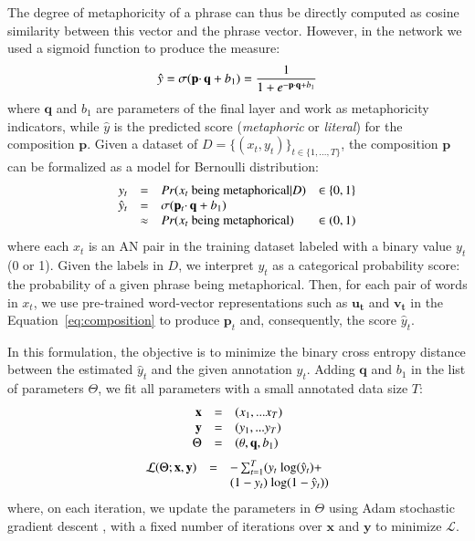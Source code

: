 The degree of metaphoricity of a phrase can thus be directly computed as cosine similarity between this vector and the phrase vector.
However, in the network we used a sigmoid function to produce the measure:  
\begin{equation}
\hat{y} = \sigma(\mathbf{p} \cdotp \mathbf{q} + b_1) \\
= \frac{1}{1+e^{-\mathbf{p} \cdotp \mathbf{q} + b_1}}
\end{equation}
where $\mathbf{q}$ and $b_1$ are parameters of the final layer and work as metaphoricity indicators, while $\hat{y}$ is the predicted score (\textit{metaphoric} or \textit{literal}) for the composition $\mathbf{p}$. Given a dataset of $D = \{(x_t, y_t)\}_{t \in \{1,...,T\}}$, the composition $\mathbf{p}$ can be formalized as a model for Bernoulli distribution:
\begin{equation}
    \begin{array}{r c l l}
        y_t &=& Pr(x_t\ \mathrm{being\ metaphorical}|D) &\in \{0,1\}\\
        \hat{y}_t & = & \sigma(\mathbf{p}_t \cdotp \mathbf{q} + b_1) & \\
        		  & \approx & Pr(x_t\ \mathrm{being\ metaphorical}) &\in (0, 1) \\
    \end{array}
\end{equation}
where each $x_t$ is an AN pair in the training dataset labeled with a binary value $y_t$  (0 or 1). Given the labels in $D$, we interpret $y_t$ as a categorical probability score: the probability of a given phrase being metaphorical. Then, for each pair of words in $x_t$, we use pre-trained word-vector representations such as $\mathbf{u_t}$ and $\mathbf{v_t}$ in the Equation~\ref{eq:composition} to produce $\mathbf{p}_t$ and, consequently, the score $\hat{y}_t$.

In this formulation, the objective is to minimize the binary cross entropy distance between the estimated $\hat{y}_t$ and the given annotation $y_t$. Adding $\mathbf{q}$ and $b_1$ in the list of parameters $\Theta$, we fit all parameters with a small annotated data size $T$:
\begin{equation}
    \begin{array}{r c l}
        \mathbf{x} &=& (x_1, ... x_T) \\
        \mathbf{y} &=& (y_1, ... y_T) \\
        \Theta &=& (\theta, \mathbf{q}, b_1) \\
    \end{array}
\end{equation}
\begin{equation}
\begin{array}{r l l}
\mathcal{L}(\Theta;\mathbf{x}, \mathbf{y}) &=& -\sum_{t=1}^{T}( y_t\ \mathrm{log} (\hat{y}_t) + \\
 & & (1-y_t)\ \mathrm{log} (1-\hat{y}_t))
\end{array}
\end{equation}
where, on each iteration, we update the parameters in $\Theta$ using Adam stochastic gradient descent \cite{kingma2014adam}, with a fixed number of iterations over $\mathbf{x}$ and $\mathbf{y}$ to minimize $\mathcal{L}$.

